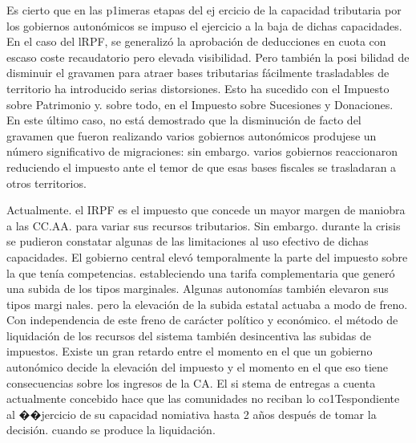 \documentclass[10pt,a4paper]{article}
\begin{document}
Es cierto que en las p1imeras etapas del ej ercicio de la capacidad tributaria por los gobiernos autonómicos se impuso el ejercicio a la baja de dichas capacidades. En el caso del lRPF, se generalizó la aprobación de deducciones en cuota con escaso coste recaudatorio pero elevada visibilidad. Pero también la posi bilidad de disminuir el gravamen para atraer bases tributarias fácilmente trasladables de territorio ha introducido serias distorsiones. Esto ha sucedido con el Impuesto sobre Patrimonio y. sobre todo, en el Impuesto sobre Sucesiones y Donaciones. En este último caso, no está demostrado que la disminución de facto del gravamen que fueron realizando varios gobiernos autonómicos produjese un número significativo de migraciones: sin embargo. varios gobiernos reaccionaron reduciendo el impuesto ante el temor de que esas bases fiscales se trasladaran a otros territorios. 

Actualmente. el IRPF es el impuesto que concede un mayor margen de maniobra a las CC.AA. para variar sus recursos tributarios. Sin embargo. durante la crisis se pudieron constatar algunas de las limitaciones al uso efectivo de dichas capacidades. El gobierno central elevó temporalmente la parte del impuesto sobre la que tenía competencias. estableciendo una tarifa complementaria que generó una subida de los tipos marginales. Algunas autonomías también elevaron sus tipos margi nales. pero la elevación de la subida estatal actuaba a modo de freno. Con independencia de este freno de carácter político y económico. el método de liquidación de los recursos del sistema también desincentiva las subidas de impuestos. Existe un gran retardo entre el momento en el que un gobierno autonómico decide la elevación del impuesto y el momento en el que eso tiene consecuencias sobre los ingresos de la CA. El si stema de entregas a cuenta actualmente concebido hace que las comunidades no reciban lo co1Tespondiente al ��jercicio de su capacidad nomiativa hasta 2 años después de tomar la decisión. cuando se produce la liquidación.
\end{document}
